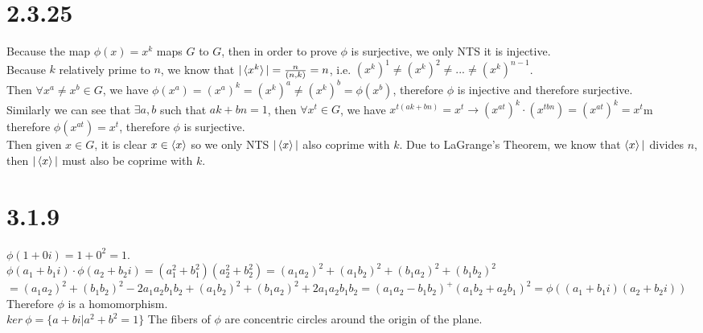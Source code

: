 \documentclass{article}
\begin{document}
\section{2.3.25}
Because the map $\phi(x) = x^k$ maps $G$ to $G$, then in order to prove $\phi$ is surjective, we only NTS it is injective.\\
Because $k$ relatively prime to $n$, we know that $|\braket{x^k}| = \frac{n}{(n, k)} = n$, i.e. $(x^k)^1 \neq (x^k)^2 \neq ... \neq (x^k)^{n-1}$.\\
Then $\forall x^a \neq x^b \in G$, we have $\phi(x^a) = (x^a)^k = (x^k)^a \neq (x^k)^b = \phi(x^b)$, therefore $\phi$ is injective and therefore surjective.\\
Similarly we can see that $\exists a, b$ such that $ak+bn = 1$, then $\forall x^t \in G$, we have $x^{t(ak+bn)} = x^t \rightarrow (x^{at})^k \cdot (x^{tbn}) = (x^{at})^k = x^t$m therefore $\phi(x^{at}) = x^t$, therefore $\phi$ is surjective.\\
Then given $x \in G$, it is clear $x \in \braket{x}$ so we only NTS $|\braket{x}|$ also coprime with $k$. Due to LaGrange's Theorem, we know that $\braket{x}|$ divides $n$, then $|\braket{x}|$ must also be coprime with $k$.
\section{3.1.9}
$\phi(1+0i) = 1 + 0^2 = 1$.\\
$\phi(a_1+b_1i) \cdot \phi(a_2+b_2i) =(a_1^2 + b_1^2)(a_2^2 + b_2^2) = (a_1a_2)^2 + (a_1b_2)^2 + (b_1a_2)^2 + (b_1b_2)^2$
$= (a_1a_2)^2 + (b_1b_2)^2 - 2a_1a_2b_1b_2 + (a_1b_2)^2 + (b_1a_2)^2 + 2a_1a_2b_1b_2 = (a_1a_2 - b_1b_2)^ + (a_1b_2 + a_2b_1)^2 = \phi((a_1+b_1i)(a_2+b_2i))$
Therefore $\phi$ is a homomorphism.\\
$ker\ \phi = \{a+bi|a^2+b^2 = 1\}$
The fibers of $\phi$ are concentric circles around the origin of the plane.
\end{document}
